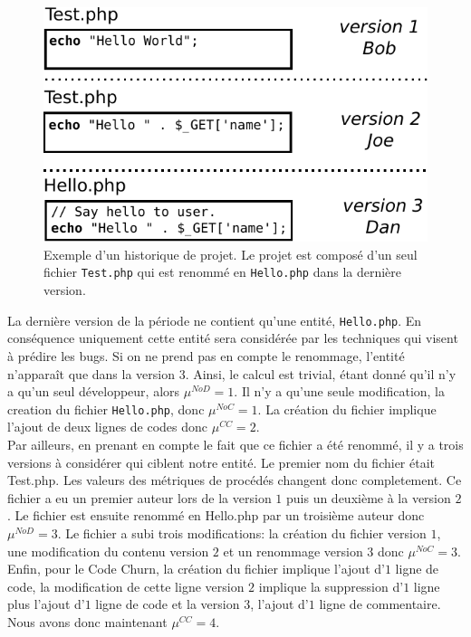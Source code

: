 \begin{figure}[t]
	\centering
	\includegraphics[width=0.8\linewidth,keepaspectratio]{data/figures/example.pdf}
	\caption{Exemple d'un historique de projet. Le projet est composé d'un seul fichier \texttt{Test.php} qui est renommé en \texttt{Hello.php} dans la dernière version.}
	\label{fig:example}
\end{figure}

La dernière version de la période ne contient qu'une entité, \texttt{Hello.php}. En conséquence uniquement cette entité sera considérée par les techniques qui visent à prédire les bugs. Si on ne prend pas en compte le renommage, l'entité n'apparaît que dans la version 3. Ainsi, le calcul est trivial, étant donné qu'il n'y a qu'un seul développeur, alors $\mu^{NoD}=1$. Il n'y a qu'une seule modification, la creation du fichier \texttt{Hello.php}, donc $\mu^{NoC}=1$. La création du fichier implique l'ajout de deux lignes de codes donc $\mu^{CC}=2$.\\

Par ailleurs, en prenant en compte le fait que ce fichier a été renommé, il y a trois versions à considérer qui ciblent notre entité. Le premier nom du fichier était Test.php. Les valeurs des métriques de procédés changent donc completement. Ce fichier a eu un premier auteur lors de la version $1$ puis un deuxième à la version $2$. Le fichier est ensuite renommé en Hello.php par un troisième auteur donc $\mu^{NoD}=3$. Le fichier a subi trois modifications: la création du fichier version $1$, une modification du contenu version $2$ et un renommage version $3$ donc $\mu^{NoC}=3$. Enfin, pour le Code Churn, la création du fichier implique l'ajout d'$1$ ligne de code, la modification de cette ligne version $2$ implique la suppression d'$1$ ligne plus l'ajout d'$1$ ligne de code et la version 3, l'ajout d'$1$ ligne de commentaire. Nous avons donc maintenant $\mu^{CC}=4$. \\

